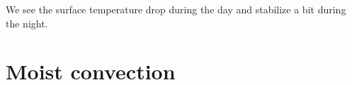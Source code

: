 \documentclass[11pt]{article}
\begin{document}
We see the surface temperature drop during the day and stabilize a bit during the night.

\section{Moist convection}


%
\end{document}
